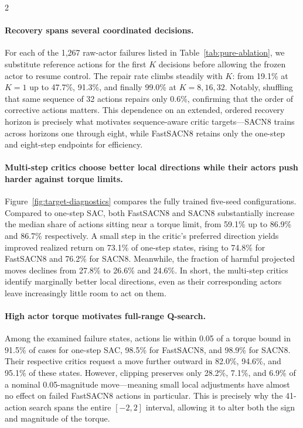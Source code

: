 \begin{multicols}{2}
\small
\paragraph{Recovery spans several coordinated decisions.}
For each of the 1,267 raw-actor failures listed in
Table~\ref{tab:pure-ablation}, we substitute reference actions for the
first $K$ decisions before allowing the frozen actor to resume
control. The repair rate climbs steadily with $K$: from 19.1\% at
$K=1$ up to 47.7\%, 91.3\%, and finally 99.0\% at $K=8,16,32$.
Notably, shuffling that same sequence of 32 actions repairs only 0.6\%,
confirming that the order of corrective actions matters. This
dependence on an extended, ordered recovery horizon is precisely what
motivates sequence-aware critic targets—SACN8 trains across horizons
one through eight, while FastSACN8 retains only the one-step and
eight-step endpoints for efficiency.

\paragraph{Multi-step critics choose better local directions while their actors push harder against torque limits.}
Figure~\ref{fig:target-diagnostics} compares the fully trained
five-seed configurations. Compared to one-step SAC, both FastSACN8 and
SACN8 substantially increase the median share of actions sitting near
a torque limit, from 59.1\% up to 86.9\% and 86.7\% respectively. A
small step in the critic's preferred direction yields improved
realized return on 73.1\% of one-step states, rising to 74.8\% for
FastSACN8 and 76.2\% for SACN8. Meanwhile, the fraction of harmful
projected moves declines from 27.8\% to 26.6\% and 24.6\%. In short,
the multi-step critics identify marginally better local directions,
even as their corresponding actors leave increasingly little room to
act on them.

\paragraph{High actor torque motivates full-range Q-search.}
Among the examined failure states, actions lie within 0.05 of a
torque bound in 91.5\% of cases for one-step SAC, 98.5\% for
FastSACN8, and 98.9\% for SACN8. Their respective critics request a
move further outward in 82.0\%, 94.6\%, and 95.1\% of these states.
However, clipping preserves only 28.2\%, 7.1\%, and 6.9\% of a nominal
0.05-magnitude move—meaning small local adjustments have almost no
effect on failed FastSACN8 actions in particular. This is precisely
why the 41-action search spans the entire $[-2,2]$ interval, allowing
it to alter both the sign and magnitude of the torque.


\end{multicols}

